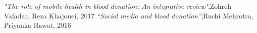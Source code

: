 \documentclass[12pt]{report}
\begin{document}

\newpage
%
%





\begin{thebibliography}{99}
\bibitem{} \emph{"The role of mobile health in blood donation: An integrative review"};Zohreh Vafadar, Reza Khajouei, 2017
\bibitem{} \emph{“Social media and blood donation”};Ruchi Mehrotra, Priyanka Rawat, 2016
\end{thebibliography}


\end{document}
